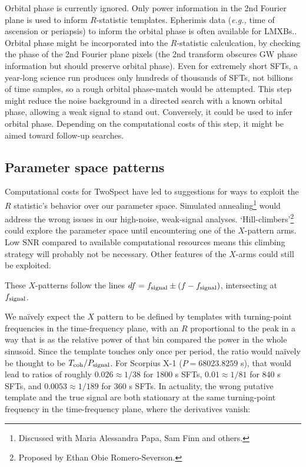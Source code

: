 Orbital phase is currently ignored.
Only power information in the 2nd Fourier plane is used to inform $R$-statistic templates.
Epherimis data (\textit{e.g.,} time of ascension or periapsis) to inform the orbital phase is often available for LMXBs..
Orbital phase might be incorporated into the $R$-statistic calculcation, by checking the phase of the 2nd Fourier plane pixels (the 2nd transform obscures GW phase information but should preserve orbital phase).
Even for extremely short SFTs, a year-long science run produces only hundreds of thousands of SFTs, not billions of time samples, so a rough orbital phase-match would be attempted.
This step might reduce the noise background in a directed search with a known orbital phase, allowing a weak signal to stand out.
Conversely, it could be used to infer orbital phase.
Depending on the computational costs of this step, it might be aimed toward follow-up searches.

\subsection{Parameter space patterns}
Computational costs for TwoSpect have led to suggestions for ways to exploit the $R$ statistic's behavior over our parameter space. 
Simulated annealing\footnote{Discussed with Maria Alessandra Papa, Sam Finn and others.} would address the wrong issues in our high-noise, weak-signal analyses. 
`Hill-climbers'\footnote{Proposed by Ethan Obie Romero-Severson.} could explore the parameter space until encountering one of the $X$-pattern arms. 
Low SNR compared to available computational resources means this climbing strategy will probably not be necessary. 
Other features of the $X$-arms could still be exploited.

These $X$-patterns follow the lines $df = f_{\textup{signal}} \pm (f - f_\textup{signal})$, intersecting at $f_\textup{signal}$.

We na\"{i}vely expect the $X$ pattern to be defined by templates with turning-point frequencies in the time-frequency plane, with an $R$ proportional to the peak in a way that is as the relative power of that bin compared the power in the whole sinusoid. 
Since the template touches only once per period, the ratio would na\"{i}vely be thought to be $T_{\textup{coh}} / P_{\textup{signal}}$. 
For Scorpius X-1 ($P = 68023.8259$ s), that would lead to ratios of roughly $0.026 \approx 1/38$ for 1800 s SFTs, $0.01 \approx 1/81$ for 840 s SFTs, and $0.0053 \approx 1/189$ for 360 s SFTs.
In actuality, the wrong putative template and the true signal are both stationary at the same turning-point frequency in the time-frequency plane, where the derivatives vanish:

